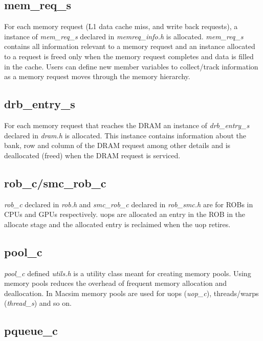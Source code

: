 \subsection{mem\_req\_s}

For each memory request (L1 data cache miss, and write back requests), a
instance of \textit{mem\_req\_s} declared in \textit{memreq\_info.h} is
allocated. \textit{mem\_req\_s} contains all information relevant to a memory
request and an instance allocated to a request is freed only when the memory
request completes and data is filled in the cache. Users can define new member
variables to collect/track information as a memory request moves through the
memory hierarchy.


\subsection{drb\_entry\_s}

For each memory request that reaches the DRAM an instance of
\textit{drb\_entry\_s} declared in \textit{dram.h} is allocated. This instance
contains information about the bank, row and column of the DRAM request among
other details and is deallocated (freed) when the DRAM request is serviced.


\subsection{rob\_c/smc\_rob\_c}

\textit{rob\_c} declared in \textit{rob.h} and \textit{smc\_rob\_c} declared in
\textit{rob\_smc.h} are for ROBs in CPUs and GPUs respectively. uops are
allocated an entry in the ROB in the allocate stage and the allocated entry is
reclaimed when the uop retires.

\subsection{pool\_c}

\textit{pool\_c} defined \textit{utils.h} is a utility class meant for creating
memory pools. Using memory pools reduces the overhead of frequent memory
allocation and deallocation. In Macsim memory pools are used for uops
(\textit{uop\_c}), threads/warps (\textit{thread\_s}) and so on.


\subsection{pqueue\_c}

